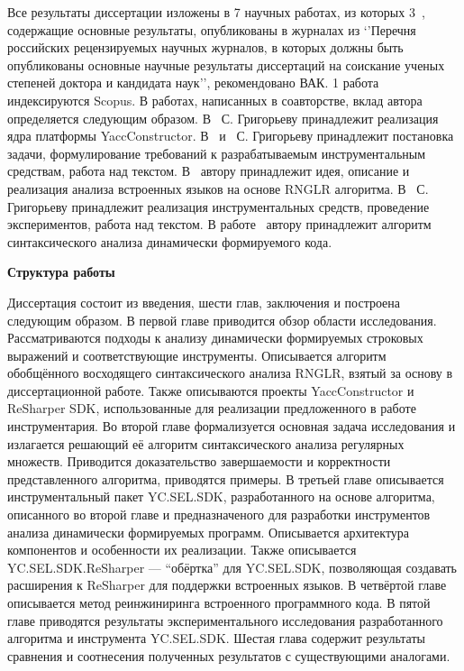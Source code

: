 Все результаты диссертации изложены в 7 научных работах, из которых 3~\cite{YCArticle,SELforIDEru,AbstractGLL}, содержащие основные результаты, опубликованы в журналах из ‘’Перечня российских рецензируемых научных журналов, в которых должны быть опубликованы основные научные результаты диссертаций на соискание ученых степеней доктора и кандидата наук’’, рекомендовано ВАК. 
1 работа~\cite{GLRAbsPars} индексируются Scopus. В работах, написанных в соавторстве, вклад автора определяется следующим образом.  В~\cite{Syrcose} С. Григорьеву принадлежит реализация ядра платформы YaccConstructor. В~\cite{SELforIDEru, AbstractGLL} и~\cite{SELforIDE} С. Григорьеву принадлежит постановка задачи, формулирование требований к разрабатываемым инструментальным средствам, работа над текстом. 
В~\cite{GLRAbsPars} автору принадлежит идея, описание и реализация анализа встроенных языков на основе RNGLR алгоритма.  В~\cite{YCArticle} С. Григорьеву принадлежит реализация инструментальных средств, проведение экспериментов, работа над текстом. В работе~\cite{RelaxedARNGLR} автору принадлежит алгоритм синтаксического анализа динамически формируемого кода.


\textbf{Структура работы}

Диссертация состоит из введения, шести глав, заключения и построена следующим образом. В первой главе приводится обзор области исследования. Рассматриваются подходы к анализу динамически формируемых строковых выражений и соответствующие инструменты. Описывается алгоритм обобщённого восходящего синтаксического анализа RNGLR, взятый за основу в диссертационной работе. Также описываются проекты YaccConstructor и ReSharper SDK, использованные для реализации предложенного в работе инструментария. Во второй главе формализуется основная задача исследования и излагается решающий её алгоритм синтаксического анализа регулярных множеств. Приводится доказательство завершаемости и корректности представленного алгоритма, приводятся примеры. В третьей главе описывается инструментальный пакет YC.SEL.SDK, разработанного на основе алгоритма, описанного во второй главе и предназначеного для разработки инструментов анализа динамически формируемых программ. Описывается архитектура компонентов и особенности их реализации. Также описывается YC.SEL.SDK.ReSharper --- ``обёртка'' для YC.SEL.SDK, позволяющая создавать расширения к ReSharper для поддержки встроенных языков. В четвёртой главе описывается метод реинжиниринга встроенного программного кода.  В пятой главе приводятся результаты экспериментального исследования разработанного алгоритма и инструмента YC.SEL.SDK. Шестая глава содержит результаты сравнения и соотнесения полученных результатов с  существующими аналогами.

